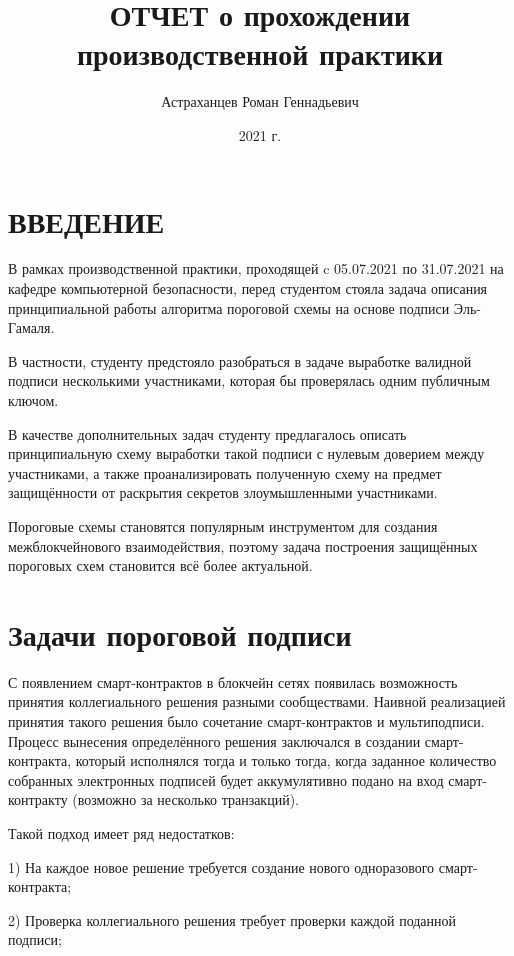 \documentclass[a4paper,12pt]{article}
\author{Астраханцев Роман Геннадьевич}
\title{ОТЧЕТ о прохождении производственной практики}
\date{2021 г.}
\begin{document}
	
	\maketitle
	
	\section*{ВВЕДЕНИЕ}
	
	В рамках производственной практики, проходящей c 05.07.2021 по 31.07.2021 на кафедре компьютерной безопасности, перед студентом стояла задача описания принципиальной работы алгоритма пороговой схемы на основе подписи Эль-Гамаля. 
	
	В частности, студенту предстояло разобраться в задаче выработке валидной подписи несколькими участниками, которая бы проверялась одним публичным ключом. 
	
	В качестве дополнительных задач студенту предлагалось описать принципиальную схему выработки такой подписи с нулевым доверием между участниками, а также проанализировать полученную схему на предмет защищённости от раскрытия секретов злоумышленными участниками. 
	
	Пороговые схемы становятся популярным инструментом для создания межблокчейнового взаимодействия, поэтому задача построения защищённых пороговых схем становится всё более актуальной.
	
	
	\section{Задачи пороговой подписи }	
	
	С появлением смарт-контрактов в блокчейн сетях появилась возможность принятия коллегиального решения разными сообществами. Наивной реализацией принятия такого решения было сочетание смарт-контрактов и мультиподписи. Процесс вынесения определённого решения заключался в создании смарт-контракта, который исполнялся тогда и только тогда, когда заданное количество собранных  электронных подписей будет аккумулятивно подано на вход смарт-контракту (возможно за несколько транзакций). 
	
	Такой подход имеет ряд недостатков:
	
	1)	На каждое новое решение требуется создание нового одноразового смарт-контракта;
	
	2)	Проверка коллегиального решения требует проверки каждой поданной подписи;
	
\end{document}
